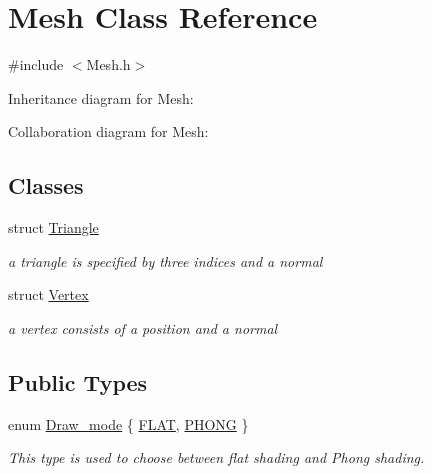 \hypertarget{classMesh}{}\section{Mesh Class Reference}
\label{classMesh}


{\ttfamily \#include $<$Mesh.\+h$>$}



Inheritance diagram for Mesh\+:


Collaboration diagram for Mesh\+:
\subsection*{Classes}
\begin{DoxyCompactItemize}
\item 
struct \hyperlink{structMesh_1_1Triangle}{Triangle}
\begin{DoxyCompactList}\small\item\em a triangle is specified by three indices and a normal \end{DoxyCompactList}\item 
struct \hyperlink{structMesh_1_1Vertex}{Vertex}
\begin{DoxyCompactList}\small\item\em a vertex consists of a position and a normal \end{DoxyCompactList}\end{DoxyCompactItemize}
\subsection*{Public Types}
\begin{DoxyCompactItemize}
\item 
enum \hyperlink{classMesh_aa4144c3cad2e62df26ad90131e59aa6a}{Draw\+\_\+mode} \{ \hyperlink{classMesh_aa4144c3cad2e62df26ad90131e59aa6aae58e62c20878ec327ed6409c7852b871}{F\+L\+AT}, 
\hyperlink{classMesh_aa4144c3cad2e62df26ad90131e59aa6aafc0cc7ddf5257c8d2a52d84573da372a}{P\+H\+O\+NG}
 \}\begin{DoxyCompactList}\small\item\em This type is used to choose between flat shading and Phong shading. \end{DoxyCompactList}
\end{DoxyCompactItemize}
